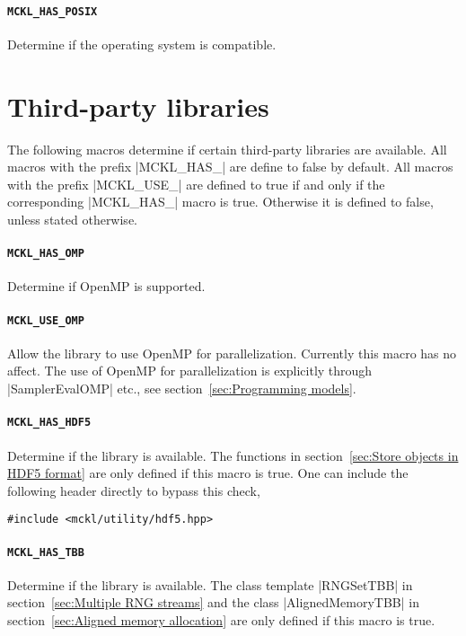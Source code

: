 \paragraph{\texttt{MCKL\_HAS\_POSIX}} Determine if the operating system is
\posix compatible.

\section{Third-party libraries}
\label{sec:Third-party libraries}

The following macros determine if certain third-party libraries are available.
All macros with the prefix |MCKL_HAS_| are define to false by default. All
macros with the prefix |MCKL_USE_| are defined to true if and only if the
corresponding |MCKL_HAS_| macro is true. Otherwise it is defined to false,
unless stated otherwise.

\paragraph{\texttt{MCKL\_HAS\_OMP}} Determine if OpenMP is supported.

\paragraph{\texttt{MCKL\_USE\_OMP}} Allow the library to use OpenMP for
parallelization. Currently this macro has no affect. The use of OpenMP for
parallelization is explicitly through |SamplerEvalOMP| etc., see
section~\ref{sec:Programming models}.

\paragraph{\texttt{MCKL\_HAS\_HDF5}} Determine if the \hdf library is
available. The functions in section~\ref{sec:Store objects in HDF5 format} are
only defined if this macro is true. One can include the following header
directly to bypass this check,
\begin{verbatim}
#include <mckl/utility/hdf5.hpp>
\end{verbatim}

\paragraph{\texttt{MCKL\_HAS\_TBB}} Determine if the \tbb library is available.
The class template |RNGSetTBB| in section~\ref{sec:Multiple RNG streams} and
the class |AlignedMemoryTBB| in section~\ref{sec:Aligned memory allocation} are
only defined if this macro is true.

